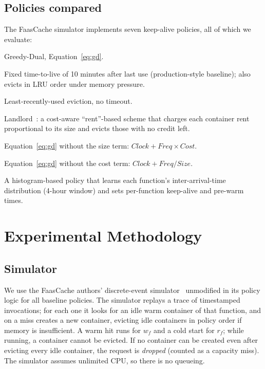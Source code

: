 \documentclass[11pt,a4paper]{article}
\begin{document}
\subsection{Policies compared}
The FaasCache simulator implements seven keep-alive policies, all of which we evaluate:
\begin{description}[font=\normalfont\scshape]
  \item[GD] Greedy-Dual, Equation~\eqref{eq:gd}.
  \item[TTL] Fixed time-to-live of 10 minutes after last use (production-style baseline);
             also evicts in LRU order under memory pressure.
  \item[LRU] Least-recently-used eviction, no timeout.
  \item[LND] Landlord~\cite{young2002landlord}: a cost-aware ``rent''-based scheme that charges
             each container rent proportional to its size and evicts those with no credit left.
  \item[FREQ] Equation~\eqref{eq:gd} without the size term: $\mathit{Clock} + \mathit{Freq}\times\mathit{Cost}$.
  \item[SIZE] Equation~\eqref{eq:gd} without the cost term: $\mathit{Clock} + \mathit{Freq}/\mathit{Size}$.
  \item[HIST] A histogram-based policy that learns each function's inter-arrival-time
              distribution (4-hour window) and sets per-function keep-alive and pre-warm times.
\end{description}

\section{Experimental Methodology}
\label{sec:method}

\subsection{Simulator}
We use the FaasCache authors' discrete-event simulator~\cite{faascachesim} unmodified in its
policy logic for all baseline policies. The simulator replays a trace of timestamped
invocations; for each one it looks for an idle warm container of that function, and on a
miss creates a new container, evicting idle containers in policy order if memory is
insufficient. A warm hit runs for $w_f$ and a cold start for $r_f$; while running, a
container cannot be evicted. If no container can be created even after evicting every idle
container, the request is \emph{dropped} (counted as a capacity miss). The simulator assumes
unlimited CPU, so there is no queueing.
\end{document}

